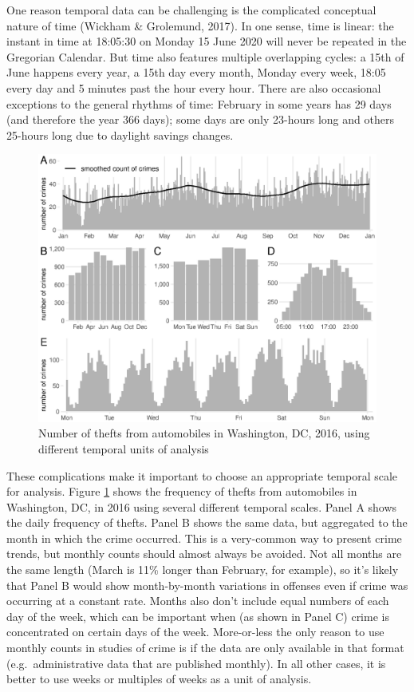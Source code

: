 \documentclass[
  english,
  man,a4paper,mask,floatsintext]{apa6}
\begin{document}
One reason temporal data can be challenging is the complicated conceptual nature of time (Wickham \& Grolemund, 2017). In one sense, time is linear: the instant in time at 18:05:30 on Monday 15 June 2020 will never be repeated in the Gregorian Calendar. But time also features multiple overlapping cycles: a 15th of June happens every year, a 15th day every month, Monday every week, 18:05 every day and 5 minutes past the hour every hour. There are also occasional exceptions to the general rhythms of time: February in some years has 29 days (and therefore the year 366 days); some days are only 23-hours long and others 25-hours long due to daylight savings changes.

\begin{figure}
\centering
\includegraphics{figure_14-3.eps}
\caption{\label{fig:scales}Number of thefts from automobiles in Washington, DC, 2016, using different temporal units of analysis}
\end{figure}

These complications make it important to choose an appropriate temporal scale for analysis. Figure \ref{fig:scales} shows the frequency of thefts from automobiles in Washington, DC, in 2016 using several different temporal scales. Panel A shows the daily frequency of thefts.
Panel B shows the same data, but aggregated to the month in which the crime occurred. This is a very-common way to present crime trends, but monthly counts should almost always be avoided. Not all months are the same length (March is 11\% longer than February, for example), so it's likely that Panel B would show month-by-month variations in offenses even if crime was occurring at a constant rate. Months also don't include equal numbers of each day of the week, which can be important when (as shown in Panel C) crime is concentrated on certain days of the week. More-or-less the only reason to use monthly counts in studies of crime is if the data are only available in that format (e.g.~administrative data that are published monthly). In all other cases, it is better to use weeks or multiples of weeks as a unit of analysis.
\end{document}

